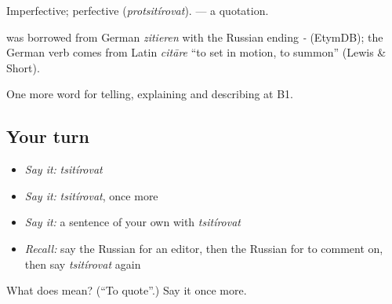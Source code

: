 Imperfective; perfective \emph{} (\emph{protsitírovat}). \emph{} — a quotation.

\begin{cousinweb}
\emph{} was borrowed from German \emph{zitieren} with the Russian ending \emph{-} (EtymDB); the German verb comes from Latin \emph{citāre} \textquotedblleft{}to set in motion, to summon\textquotedblright{} (Lewis \& Short).
\end{cousinweb}

\begin{grammarlens}[title={What you've built}]
One more word for telling, explaining and describing at B1.
\end{grammarlens}

\subsection*{Your turn}
\begin{itemize}
\raggedright
  \item \emph{Say it:} \emph{tsitírovat}
  \item \emph{Say it:} \emph{tsitírovat}, once more
  \item \emph{Say it:} a sentence of your own with \emph{tsitírovat}
  \item \emph{Recall:} say the Russian for an editor, then the Russian for to comment on, then say \emph{tsitírovat} again
\end{itemize}

\begin{tcolorbox}[breakable,colback=teal!4,colframe=teal!35!black,title={Before you move on}]
What does  mean? (\textquotedblleft{}To quote\textquotedblright{}.) Say it once more.
\end{tcolorbox}
